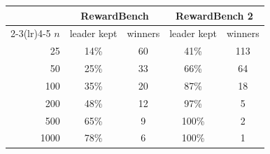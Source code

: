 \begin{tabular}{rcccc}
\toprule
& \multicolumn{2}{c}{RewardBench} & \multicolumn{2}{c}{RewardBench 2}\\
\cmidrule(lr){2-3}\cmidrule(lr){4-5}
$n$ & leader kept & winners & leader kept & winners\\
\midrule
25 & 14\% & 60 & 41\% & 113\\
50 & 25\% & 33 & 66\% & 64\\
100 & 35\% & 20 & 87\% & 18\\
200 & 48\% & 12 & 97\% & 5\\
500 & 65\% & 9 & 100\% & 2\\
1000 & 78\% & 6 & 100\% & 1\\
\bottomrule
\end{tabular}
